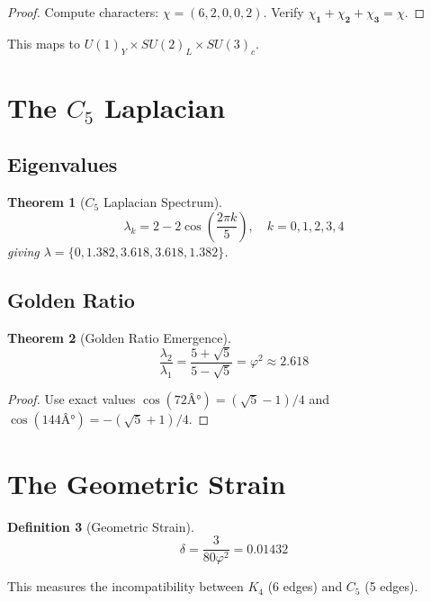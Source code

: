 \documentclass[11pt,a4paper]{article}
\newtheorem{theorem}{Theorem}[section]
\theoremstyle{definition}
\newtheorem{definition}[theorem]{Definition}
\newcommand{\dgeo}{\delta}
\begin{document}
\begin{proof}
Compute characters: $\chi = (6, 2, 0, 0, 2)$. Verify $\chi_{\mathbf{1}} + \chi_{\mathbf{2}} + \chi_{\mathbf{3}} = \chi$.
\end{proof}

This maps to $U(1)_Y \times SU(2)_L \times SU(3)_c$.

\section{The $C_5$ Laplacian}

\subsection{Eigenvalues}

\begin{theorem}[$C_5$ Laplacian Spectrum]
\begin{equation}
\lambda_k = 2 - 2\cos\left(\frac{2\pi k}{5}\right), \quad k = 0,1,2,3,4
\end{equation}
giving $\lambda = \{0, 1.382, 3.618, 3.618, 1.382\}$.
\end{theorem}

\subsection{Golden Ratio}

\begin{theorem}[Golden Ratio Emergence]
\begin{equation}
\frac{\lambda_2}{\lambda_1} = \frac{5 + \sqrt{5}}{5 - \sqrt{5}} = \varphi^2 \approx 2.618
\end{equation}
\end{theorem}

\begin{proof}
Use exact values $\cos(72Â°) = (\sqrt{5}-1)/4$ and $\cos(144Â°) = -(\sqrt{5}+1)/4$.
\end{proof}

\section{The Geometric Strain}

\begin{definition}[Geometric Strain]
\begin{equation}
\dgeo = \frac{3}{80\varphi^2} = 0.01432
\end{equation}
\end{definition}

This measures the incompatibility between $K_4$ (6 edges) and $C_5$ (5 edges).
\end{document}
